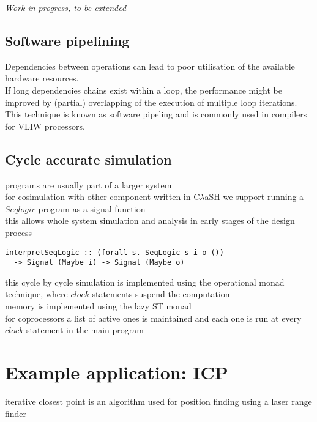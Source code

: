 \documentclass[preprint]{sigplanconf}
\def\codesmall{\sffamily\small}
\def\clash{C$\lambda$aSH\xspace}
\begin{document}
\textit{Work in progress, to be extended}


\subsection{Software pipelining}
Dependencies between operations can lead to poor utilisation of the available hardware resources.\\
If long dependencies chains exist within a loop, the performance might be improved by (partial) overlapping of the execution of multiple loop iterations. \\
This technique is known as software pipeling and is commonly used in compilers for VLIW processors.

\subsection{Cycle accurate simulation}
programs are usually part of a larger system \\
for cosimulation with other component written in \clash we support running a $Seqlogic$ program as a signal function \\
this allows whole system simulation and analysis in early stages of the design process
\begin{lstlisting}
interpretSeqLogic :: (forall s. SeqLogic s i o ())
  -> Signal (Maybe i) -> Signal (Maybe o)
\end{lstlisting}
this cycle by cycle simulation is implemented using the operational monad technique, where $clock$ statements suspend the computation \\
memory is implemented using the lazy ST monad \\
for coprocessors a list of active ones is maintained and each one is run at every $clock$ statement in the main program



\section{Example application: ICP}
iterative closest point is an algorithm used for position finding using a laser range finder \cite{Robin:Hendrik}

\lstset{basicstyle=\codesmall}
\end{document}
